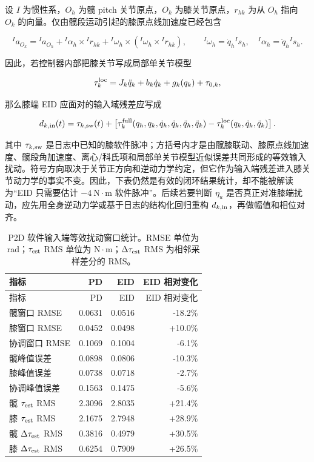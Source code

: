 设 \(I\) 为惯性系，\(O_h\) 为髋 pitch 关节原点，\(O_k\) 为膝关节原点，\(r_{hk}\) 为从 \(O_h\) 指向 \(O_k\) 的向量。仅由髋段运动引起的膝原点线加速度已经包含

\[
{}^I a_{O_k}
={}^I a_{O_h}
+{}^I\alpha_h\times{}^I r_{hk}
+{}^I\omega_h\times({}^I\omega_h\times{}^I r_{hk}),
\qquad
{}^I\omega_h=\dot q_h{}^I s_h,\quad
{}^I\alpha_h=\ddot q_h{}^I s_h .
\]

因此，若控制器内部把膝关节写成局部单关节模型

\[
\tau_k^{\rm loc}
=J_k\ddot q_k+b_k\dot q_k+g_k(q_k)+\tau_{0,k},
\]

那么膝端 EID 应面对的输入域残差应写成

\[
d_{k,\rm in}(t)
=\tau_{k,\rm sw}(t)
+\left[
\tau_k^{\rm full}(q_h,q_k,\dot q_h,\dot q_k,\ddot q_h,\ddot q_k)
-\tau_k^{\rm loc}(q_k,\dot q_k,\ddot q_k)
\right].
\]

其中 \(\tau_{k,\rm sw}\) 是日志中已知的膝软件脉冲；方括号内才是由髋膝联动、膝原点线加速度、髋段角加速度、离心/科氏项和局部单关节模型近似误差共同形成的等效输入扰动。符号方向取决于关节正方向和逆动力学约定，但它作为输入端残差进入膝关节动力学的事实不变。因此，下表仍然是有效的闭环结果统计，却不能被解读为``EID 只需要估计 \(-4\ \mathrm{N\cdot m}\) 软件脉冲''。后续若要判断 \(\eta_u\) 是否真正对准膝端扰动，应先用全身逆动力学或基于日志的结构化回归重构 \(d_{k,\rm in}\)，再做幅值和相位对齐。

\begin{longtable}[]{@{}lrrr@{}}
\caption{P2D 软件输入端等效扰动窗口统计。RMSE 单位为 rad；\(\tau_{\rm est}\) RMS 单位为 \(\mathrm{N\cdot m}\)；\(\Delta\tau_{\rm est}\) RMS 为相邻采样差分的 RMS。}\\
\toprule
指标 & PD & EID & EID 相对变化 \\
\midrule
\endfirsthead
\toprule
指标 & PD & EID & EID 相对变化 \\
\midrule
\endhead
\bottomrule
\endlastfoot
髋窗口 RMSE & 0.0631 & 0.0516 & -18.2\% \\
膝窗口 RMSE & 0.0452 & 0.0498 & +10.0\% \\
协调窗口 RMSE & 0.1069 & 0.1004 & -6.1\% \\
髋峰值误差 & 0.0898 & 0.0806 & -10.3\% \\
膝峰值误差 & 0.0738 & 0.0718 & -2.7\% \\
协调峰值误差 & 0.1563 & 0.1475 & -5.6\% \\
髋 \(\tau_{\rm est}\) RMS & 2.3096 & 2.8035 & +21.4\% \\
膝 \(\tau_{\rm est}\) RMS & 2.1675 & 2.7948 & +28.9\% \\
髋 \(\Delta\tau_{\rm est}\) RMS & 0.3816 & 0.4979 & +30.5\% \\
膝 \(\Delta\tau_{\rm est}\) RMS & 0.6254 & 0.7909 & +26.5\% \\
\end{longtable}

